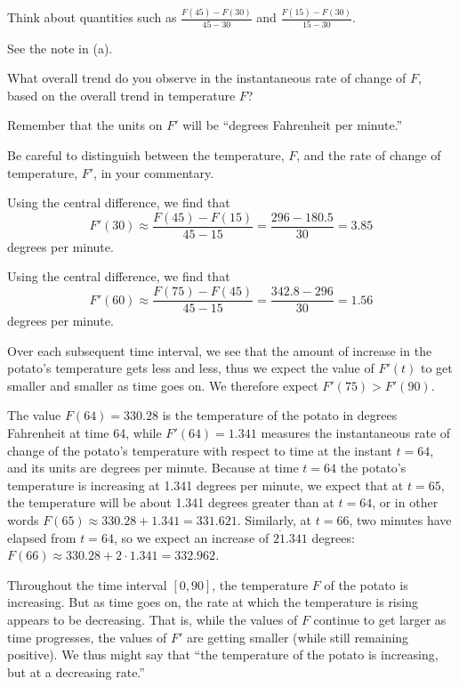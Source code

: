 \begin{bighint}
\ba
	\item Think about quantities such as $\frac{F(45)-F(30)}{45-30}$ and $\frac{F(15)-F(30)}{15-30}$.
	\item See the note in (a).
	\item What overall trend do you observe in the instantaneous rate of change of $F$, based on the overall trend in temperature $F$?
	\item Remember that the units on $F'$ will be ``degrees Fahrenheit per minute.''
	\item Be careful to distinguish between the temperature, $F$, and the rate of change of temperature, $F'$, in your commentary.
\ea
\end{bighint}
\begin{activitySolution}
\ba
	\item Using the central difference, we find that 
	$$F'(30) \approx \frac{F(45)-F(15)}{45-15} = \frac{296-180.5}{30} = 3.85$$
	degrees per minute.
	\item Using the central difference, we find that 
	$$F'(60) \approx \frac{F(75)-F(45)}{45-15} = \frac{342.8-296}{30} = 1.56$$
	degrees per minute.
	\item Over each subsequent time interval, we see that the amount of increase in the potato's temperature gets less and less, thus we expect the value of $F'(t)$ to get smaller and smaller as time goes on.  We therefore expect $F'(75) > F'(90)$.
	\item The value $F(64) = 330.28$ is the temperature of the potato in degrees Fahrenheit at time 64, while $F'(64) = 1.341$ measures the instantaneous rate of change of the potato's temperature with respect to time at the instant $t = 64$, and its units are degrees per minute.  Because at time $t = 64$ the potato's temperature is increasing at 1.341 degrees per minute, we expect that at $t = 65$, the temperature will be about 1.341 degrees greater than at $t = 64$, or in other words $F(65) \approx 330.28 + 1.341 = 331.621$.  Similarly, at $t = 66$, two minutes have elapsed from $t = 64$, so we expect an increase of $2 \dot 1.341$ degrees:  $F(66) \approx 330.28 + 2 \cdot 1.341 = 332.962$. 
	\item Throughout the time interval $[0,90]$, the temperature $F$ of the potato is increasing.  But as time goes on, the rate at which the temperature is rising appears to be decreasing.  That is, while the values of $F$ continue to get larger as time progresses, the values of $F'$ are getting smaller (while still remaining positive). We thus might say that ``the temperature of the potato is increasing, but at a decreasing rate.''
\ea
\end{activitySolution}
\aftera